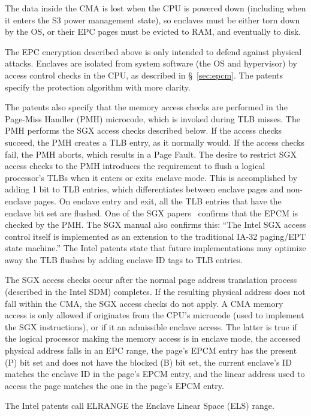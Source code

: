 The data inside the CMA is lost when the CPU is powered down (including when it
enters the S3 power management state), so enclaves must be either torn down by
the OS, or their EPC pages must be evicted to RAM, and eventually to disk.

The EPC encryption described above is only intended to defend against physical
attacks. Enclaves are isolated from system software (the OS and hypervisor) by
access control checks in the CPU, as described in \S~\ref{sec:epcm}. The
patents specify the protection algorithm with more clarity.

The patents also specify that the memory access checks are performed in the
Page-Miss Handler (PMH) microcode, which is invoked during TLB misses. The PMH
performs the SGX access checks described below. If the access checks succeed,
the PMH creates a TLB entry, as it normally would. If the access checks fail,
the PMH aborts, which results in a Page Fault. The desire to restrict SGX
access checks to the PMH introduces the requirement to flush a logical
processor's TLBs when it enters or exits enclave mode. This is accomplished by
adding 1 bit to TLB entries, which differentiates between enclave pages and
non-enclave pages.
On enclave entry and exit, all the TLB entries that have the enclave bit set
are flushed. One of the SGX papers~\cite{mckeen2013sgx} confirms that the EPCM
is checked by the PMH.
The SGX manual also confirms this: ``The Intel SGX access control itself is
implemented as an extension to the traditional IA-32 paging/EPT state
machine.''
The Intel patents state that future implementations may optimize away the TLB
flushes by adding enclave ID tags to TLB entries.

The SGX access checks occur after the normal page address translation process
(described in the Intel SDM) completes.
If the resulting physical address does not fall within the CMA, the
SGX access checks do not apply.
A CMA memory access is only allowed if originates from the CPU's microcode
(used to implement the SGX instructions), or if it an admissible enclave
access.
The latter is true if the logical processor making the memory access is in
enclave mode, the accessed physical address falls in an EPC range, the page's
EPCM entry has the present (P) bit set and does not have the blocked (B) bit
set, the current enclave's ID matches the enclave ID in the page's EPCM entry,
and the linear address used to access the page matches the one in the page's
EPCM entry.

The Intel patents call ELRANGE the Enclave Linear Space (ELS) range.



